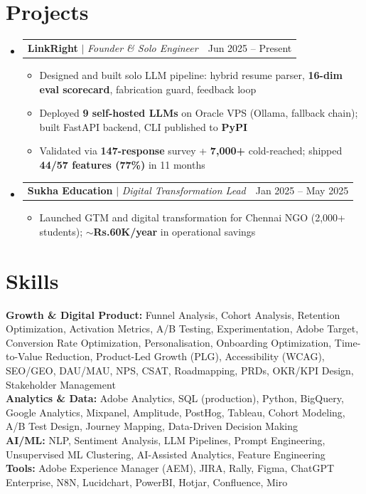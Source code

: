 \documentclass[a4paper,10pt]{article}
\makeatletter
\newcommand{\resumeItem}[1]{
  \item\small{#1\vspace{-2pt}}
}
\newcommand{\resumeProjectHeading}[2]{
  \item
  \begin{tabular*}{0.97\textwidth}{l@{\extracolsep{\fill}}r}
    \small#1 & #2 \\
  \end{tabular*}\vspace{-7pt}
}
\newcommand{\resumeSubHeadingListStart}{\begin{itemize}[leftmargin=0.15in, label={}]}
\newcommand{\resumeSubHeadingListEnd}{\end{itemize}}
\newcommand{\resumeItemListStart}{\begin{itemize}\parfillskip=0pt}
\newcommand{\resumeItemListEnd}{\end{itemize}\vspace{-5pt}}
\makeatother
\begin{document}
\section{Projects}
\resumeSubHeadingListStart

  \resumeProjectHeading
    {\textbf{LinkRight} $|$ \emph{Founder \& Solo Engineer}}{Jun 2025 -- Present}
  \resumeItemListStart
    \resumeItem{Designed and built solo LLM pipeline: hybrid resume parser, \textbf{16-dim eval scorecard}, fabrication guard, feedback loop}
    \resumeItem{Deployed \textbf{9 self-hosted LLMs} on Oracle VPS (Ollama, fallback chain); built FastAPI backend, CLI published to \textbf{PyPI}}
    \resumeItem{Validated via \textbf{147-response} survey + \textbf{7,000+} cold-reached; shipped \textbf{44/57 features (77\%)} in 11 months}
  \resumeItemListEnd

  \resumeProjectHeading
    {\textbf{Sukha Education} $|$ \emph{Digital Transformation Lead}}{Jan 2025 -- May 2025}
  \resumeItemListStart
    \resumeItem{Launched GTM and digital transformation for Chennai NGO (2,000+ students); \textbf{$\sim$Rs.60K/year} in operational savings}
  \resumeItemListEnd

\resumeSubHeadingListEnd

\section{Skills}
\begin{itemize}[leftmargin=0.15in, label={}]
  \small{\item{
    \textbf{Growth \& Digital Product:}{ Funnel Analysis, Cohort Analysis, Retention Optimization, Activation Metrics, A/B Testing, Experimentation, Adobe Target, Conversion Rate Optimization, Personalisation, Onboarding Optimization, Time-to-Value Reduction, Product-Led Growth (PLG), Accessibility (WCAG), SEO/GEO, DAU/MAU, NPS, CSAT, Roadmapping, PRDs, OKR/KPI Design, Stakeholder Management} \\
    \textbf{Analytics \& Data:}{ Adobe Analytics, SQL (production), Python, BigQuery, Google Analytics, Mixpanel, Amplitude, PostHog, Tableau, Cohort Modeling, A/B Test Design, Journey Mapping, Data-Driven Decision Making} \\
    \textbf{AI/ML:}{ NLP, Sentiment Analysis, LLM Pipelines, Prompt Engineering, Unsupervised ML Clustering, AI-Assisted Analytics, Feature Engineering} \\
    \textbf{Tools:}{ Adobe Experience Manager (AEM), JIRA, Rally, Figma, ChatGPT Enterprise, N8N, Lucidchart, PowerBI, Hotjar, Confluence, Miro}
  }}
\end{itemize}
\end{document}

